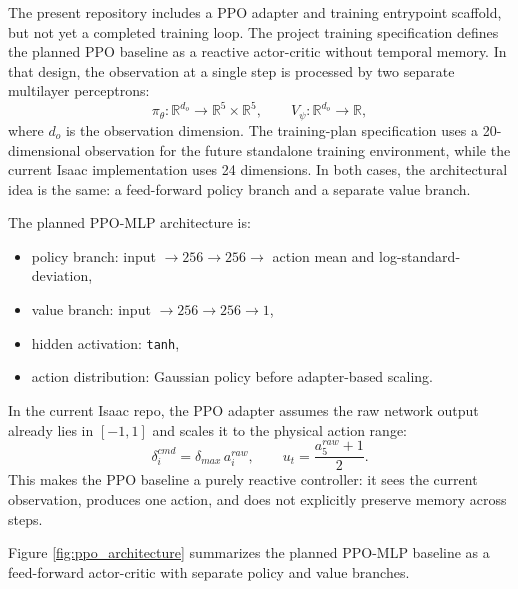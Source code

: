 \documentclass[10pt,twocolumn]{article}
\begin{document}
The present repository includes a PPO adapter and training entrypoint scaffold, but not yet a completed training loop. The project training specification defines the planned PPO baseline as a reactive actor-critic without temporal memory. In that design, the observation at a single step is processed by two separate multilayer perceptrons:
\begin{equation}
\pi_{\theta}: \mathbb{R}^{d_o}\rightarrow \mathbb{R}^{5}\times\mathbb{R}^{5},
\qquad
V_{\psi}: \mathbb{R}^{d_o}\rightarrow \mathbb{R},
\label{eq:ppo_actor_critic}
\end{equation}
where $d_o$ is the observation dimension. The training-plan specification uses a 20-dimensional observation for the future standalone training environment, while the current Isaac implementation uses 24 dimensions. In both cases, the architectural idea is the same: a feed-forward policy branch and a separate value branch.

The planned PPO-MLP architecture is:
\begin{itemize}
    \item policy branch: input $\rightarrow 256 \rightarrow 256 \rightarrow$ action mean and log-standard-deviation,
    \item value branch: input $\rightarrow 256 \rightarrow 256 \rightarrow 1$,
    \item hidden activation: \texttt{tanh},
    \item action distribution: Gaussian policy before adapter-based scaling.
\end{itemize}

In the current Isaac repo, the PPO adapter assumes the raw network output already lies in $[-1,1]$ and scales it to the physical action range:
\begin{equation}
\delta_i^{cmd} = \delta_{max}\,a_i^{raw},
\qquad
u_t = \frac{a_5^{raw}+1}{2}.
\label{eq:ppo_scaling}
\end{equation}
This makes the PPO baseline a purely reactive controller: it sees the current observation, produces one action, and does not explicitly preserve memory across steps.

Figure \ref{fig:ppo_architecture} summarizes the planned PPO-MLP baseline as a feed-forward actor-critic with separate policy and value branches.
\end{document}
